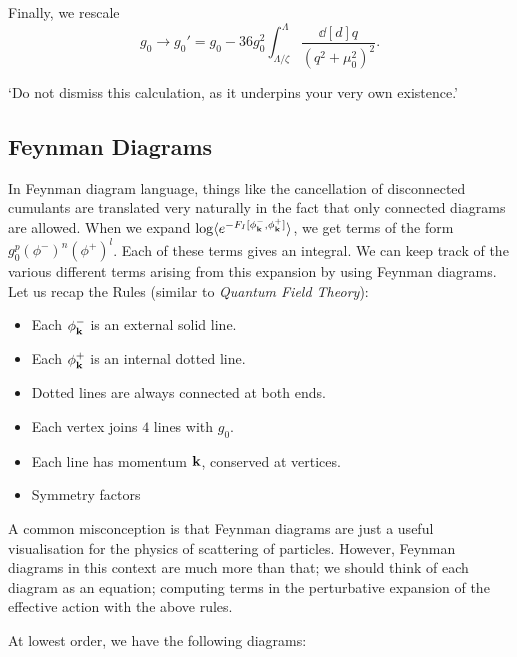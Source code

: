 Finally, we rescale 
\begin{equation}
  g_0 \to g_0' = g_0 - 36 g_0^2 \int_{\Lambda/\zeta}^\Lambda \frac{\dd[d]{q}}{(q^2 + \mu_0^2)^2}.
\end{equation}
\begin{leftbar}
  \begin{remark}
    `Do not dismiss this calculation, as it underpins your very own existence.'
  \end{remark}
\end{leftbar}

\subsection{Feynman Diagrams}%
\label{sub:feynman_diagrams}

In Feynman diagram language, things like the cancellation of disconnected cumulants are translated very naturally in the fact that only connected diagrams are allowed.
When we expand $\log \langle e^{-F_I[\phi_{\vb{k}}^-, \phi^+_{\vb{k}}]} \rangle$, we get terms of the form $g_0^p (\phi^-)^n (\phi^+)^l$. Each of these terms gives an integral. We can keep track of the various different terms arising from this expansion by using Feynman diagrams.
Let us recap the Rules (similar to \emph{Quantum Field Theory}):
\begin{itemize}
  \item Each $\phi^-_{\vb{k}}$ is an external solid line.
  \item Each $\phi^+_{\vb{k}}$ is an internal dotted line.
  \item Dotted lines are always connected at both ends.
  \item Each vertex joins $4$ lines with $g_0$.
  \item Each line has momentum $\vb{k}$, conserved at vertices.
  \item Symmetry factors
\end{itemize}
\begin{leftbar}
  \begin{remark}
    A common misconception is that Feynman diagrams are just a useful visualisation for the physics of scattering of particles.
    However, Feynman diagrams in this context are much more than that; we should think of each diagram as an equation; computing terms in the perturbative expansion of the effective action with the above rules.
  \end{remark}
\end{leftbar}
At lowest order, we have the following diagrams:
